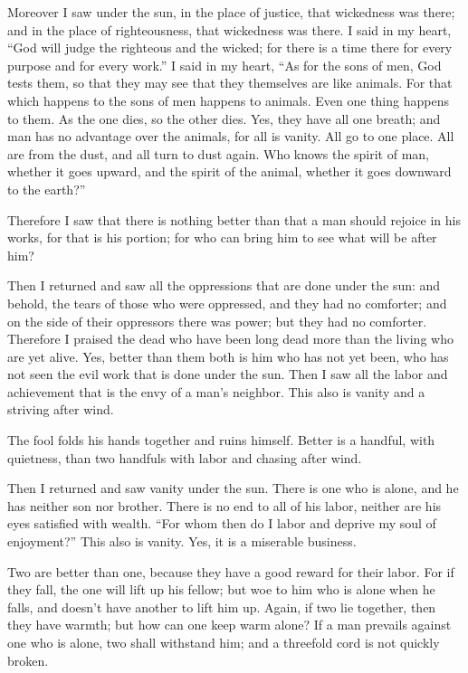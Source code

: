 \myverse{}Moreover I saw under the sun, in the place of justice, that wickedness
was there; and in the place of righteousness, that wickedness was there.
\myverse{}I said in my heart, “God will judge the righteous and the wicked; for there
is a time there for every purpose and for every work.”
\myverse{}I said in my heart, “As for the sons of men, God tests them, so that they
may see that they themselves are like animals.
\myverse{}For that which happens to the sons of men happens to animals. Even one thing
happens to them. As the one dies, so the other dies. Yes, they have all one breath; and man has no advantage
over the animals, for all is vanity.
\myverse{}All go to one place. All are from the dust, and all turn to dust again.
\myverse{}Who knows the spirit of man, whether it goes upward, and the spirit of the
animal, whether it goes downward to the earth?”

\myverse{}Therefore I saw that there is nothing better than that a man
should rejoice in his works, for that is his portion; for who can bring him to see what will be after
him?



\mychapter{} \myverse*{}Then I returned and saw all the oppressions that are done under
the sun: and behold, the tears of those who were oppressed, and they had no comforter; and on the side
of their oppressors there was power; but they had no comforter.
\myverse{}Therefore I praised the dead who have been long dead more than the living who
are yet alive.
\myverse{}Yes, better than them both is him who has not yet been, who has not seen the
evil work that is done under the sun.
\myverse{}Then I saw all the labor and achievement that is the envy of a man’s neighbor.
This also is vanity and a striving after wind.

\myverse{}The fool folds his hands together and ruins himself.
\myverse{}Better is a handful, with quietness, than two handfuls with labor and chasing
after wind.

\myverse{}Then I returned and saw vanity under the sun.
\myverse{}There is one who is alone, and he has neither son nor brother. There is no end
to all of his labor, neither are his eyes satisfied with wealth. “For whom then do I labor and deprive
my soul of enjoyment?” This also is vanity. Yes, it is a miserable business.

\myverse{}Two are better than one, because they have a good reward for their
labor.
\myverse{}For if they fall, the one will lift up his fellow; but woe to him who is alone
when he falls, and doesn’t have another to lift him up.
\myverse{}Again, if two lie together, then they have warmth; but how can one keep warm
alone?
\myverse{}If a man prevails against one who is alone, two shall withstand him; and a
threefold cord is not quickly broken.

